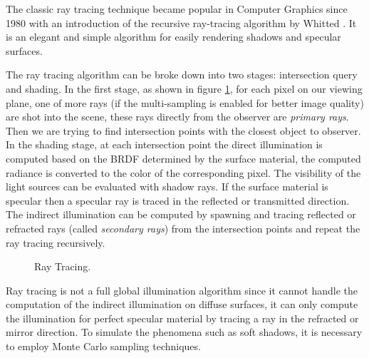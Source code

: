 The classic ray tracing technique became popular in Computer Graphics since 1980 with an introduction of the recursive ray-tracing algorithm by Whitted \cite{Whitted1980}. It is an elegant and simple algorithm for easily rendering shadows and specular surfaces. 

The ray tracing algorithm can be broke down into two stages: intersection query and shading. In the first stage, as shown in figure \ref{fig:ray_tracing}, for each pixel on our viewing plane, one of more rays (if the multi-sampling is enabled for better image quality) are shot into the scene, these rays directly from the observer are \emph{primary rays}. Then we are trying to find intersection points with the closest object to observer. In the shading stage, at each intersection point the direct illumination is computed based on the BRDF determined by the surface material, the computed radiance is converted to the color of the corresponding pixel. The visibility of the light sources can be evaluated with shadow rays. If the surface material is specular then a specular ray is traced in the reflected or transmitted direction. The indirect illumination can be computed by spawning and tracing reflected or refracted rays (called \emph{secondary rays}) from the intersection points and repeat the ray tracing recursively. 

\begin{figure}[htp] 
    \centering 
    \renewcommand{\thefigure}{\thechapter.\arabic{figure}}
    \caption[]{Ray Tracing.}
    \label{fig:ray_tracing} 
\end{figure} 

Ray tracing is not a full global illumination algorithm since it cannot handle the computation of the indirect illumination on diffuse surfaces, it can only compute the illumination for perfect specular material by tracing a ray in the refracted or mirror direction. To simulate the phenomena such as soft shadows, it is necessary to employ Monte Carlo sampling techniques\cite{Kajiya:1986:RE:15922.15902}. 


